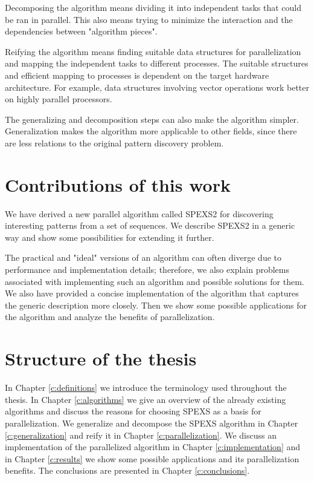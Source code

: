 Decomposing the algorithm means dividing it into independent tasks that could be ran in parallel. This also means trying to minimize the interaction and the dependencies between "algorithm pieces".

Reifying the algorithm means finding suitable data structures for parallelization and mapping the independent tasks to different processes. The suitable structures and efficient mapping to processes is dependent on the target hardware architecture. For example, data structures involving vector operations work better on highly parallel processors.

The generalizing and decomposition steps can also make the algorithm simpler. Generalization makes the algorithm more applicable to other fields, since there are less relations to the original pattern discovery problem.

\section{Contributions of this work}

We have derived a new parallel algorithm called SPEXS2 for discovering interesting patterns from a set of sequences. We describe SPEXS2 in a generic way and show some possibilities for extending it further.

The practical and "ideal" versions of an algorithm can often diverge due to performance and implementation details; therefore, we also explain problems associated with implementing such an algorithm and possible solutions for them. We also have provided a concise implementation of the algorithm that captures the generic description more closely. Then we show some possible applications for the algorithm and analyze the benefits of parallelization.

\section{Structure of the thesis}

In Chapter \ref{c:definitions} we introduce the terminology used throughout the thesis. In Chapter \ref{c:algorithms} we give an overview of the already existing algorithms and discuss the reasons for choosing SPEXS\cite{spexs} as a basis for parallelization. We generalize and decompose the SPEXS algorithm in Chapter \ref{c:generalization} and reify it in Chapter \ref{c:parallelization}. We discuss an implementation of the parallelized algorithm in Chapter \ref{c:implementation} and in Chapter \ref{c:results} we show some possible applications and its parallelization benefits. The conclusions are presented in Chapter \ref{c:conclusions}.
